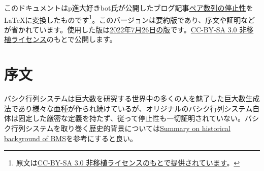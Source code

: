 \documentclass[dvipdfmx,uplatex]{jsarticle}
\title{\documenttitle}
\author{
	p進大好きbot 著
	\and
	Naruyoko 編集 %
}
\date{コンパイル日: \today}
\newif\iffull
\theoremstyle{customnonumberbreakfortheorem}
\theoremstyle{customnonumberbreakforproof}
\begin{document}
\maketitle

\renewcommand{\thefootnote}{$\diamondsuit$}

このドキュメントはp進大好きbot氏が公開したブログ記事\href{https://googology.fandom.com/ja/wiki/User\_blog:P\%E9\%80\%B2\%E5\%A4\%A7\%E5\%A5\%BD\%E3\%81\%8Dbot/\%E3\%83\%9A\%E3\%82\%A2\%E6\%95\%B0\%E5\%88\%97\%E3\%81\%AE\%E5\%81\%9C\%E6\%AD\%A2\%E6\%80\%A7}{ペア数列の停止性}を\LaTeX{}に変換したものです\footnote[0]{原文は\href{https://www.fandom.com/ja/licensing-ja}{CC-BY-SA 3.0 非移植ライセンスのもとで提供されています}。}。\iffull\else{このバージョンは要約版であり、序文や証明などが省かれています。}\fi 使用した版は\href{https://googology.fandom.com/ja/wiki/User\_blog:P\%E9\%80\%B2\%E5\%A4\%A7\%E5\%A5\%BD\%E3\%81\%8Dbot/\%E3\%83\%9A\%E3\%82\%A2\%E6\%95\%B0\%E5\%88\%97\%E3\%81\%AE\%E5\%81\%9C\%E6\%AD\%A2\%E6\%80\%A7?oldid=49288}{2022年7月26日の版}です。\href{https://creativecommons.org/licenses/by-sa/3.0/}{CC-BY-SA 3.0 非移植ライセンス}のもとで公開します。

\renewcommand{\thefootnote}{\arabic{footnote}}

\clearpage

\tableofcontents

\iffull

\section{概要}

ペア数列の停止性を示す。より正確には、数あるペア数列システムのうち１つの定式化を記述し、その中で標準形という概念を定義し、標準形のペア数列システムが停止することを証明する\footnote{当初の予定ではペア数列の解析、すなわちペア数列システムに伴う順序数表記系の限界を決定するつもりだったが、停止性の証明までを書き切るだけで大変疲れてしまった上に需要もさほどないと思うため、停止性までに留めた。}。

\fi

\section{序文}

\iffull

バシク行列システムは巨大数を研究する世界中の多くの人を魅了した巨大数生成法であり様々な亜種が作られ続けているが、オリジナルのバシク行列システム自体は固定した厳密な定義を持たず、従って停止性も一切証明されていない。バシク行列システムを取り巻く歴史的背景については\href{https://googology.wikia.com/wiki/User_blog:P\%E9\%80\%B2\%E5\%A4\%A7\%E5\%A5\%BD\%E3\%81\%8Dbot/Summary\_on\_historical\_background\_of\_BMS}{Summary on historical background of BMS}を参考にすると良い。
\end{document}
